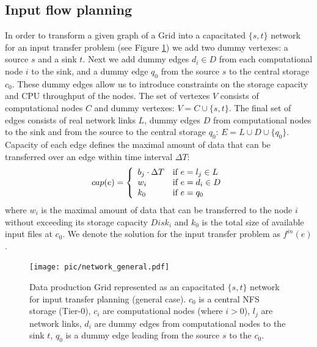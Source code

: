 \documentclass{svjour3}                     %
\begin{document}
\subsection{Input flow planning}

In order to transform a given graph of a Grid into a capacitated $\{s,t\}$
network for an input transfer problem (see Figure \ref{network_general}) we add two dummy vertexes: a source $s$
and a sink $t$. Next we add  dummy edges $d_{i} \in D$ from each computational
node $i$ to the sink, and a dummy edge $q_{0}$ from the source $s$ to the
central storage $c_{0}$. These dummy edges allow us to introduce constraints
on the storage capacity and CPU throughput of the nodes. The set of vertexes $V$ consists of
computational nodes $C$ and dummy vertexes: $V= C \cup \{s,t\}$. The final set
of edges consists of real network links $L$, dummy edges $D$ from
computational nodes to the sink and from the source to the central storage
$q_{0}$: $E= L \cup D \cup \{q_{0}\}$. Capacity of each edge defines the
maximal amount of data that can be transferred over an edge within time
interval $\Delta T$: 
%
\begin{equation} 
\label{edge_cap} 
cap(e) = \left\{
\begin{array}{l l} 
b_{j} \cdot \Delta T & \text{if }e = l_{j} \in L \\ w_{i} &
\text{if } e = d_{i} \in D\\ k_{0} & \text{if } e = q_{0} 
\end{array} \right.
\end{equation} 
%
where $w_{i}$ is the maximal amount of data that can be
transferred to the node $i$ without exceeding its storage capacity $Disk_{i}$
and $k_{0}$ is the total size of available input files at $c_{0}$. We denote
the solution for the input transfer problem as $f^{in}(e)$.
\begin{figure}
	\begin{center}
		\texttt{[image: pic/network\_general.pdf]}
	\end{center}
	\caption{Data production Grid represented as an capacitated $\{s,t\}$ network for input transfer planning (general case). $c_{0}$ is a central NFS storage (Tier-0), $c_{i}$ are computational nodes (where $i>0$), $l_{j}$ are network links, $d_{i}$ are dummy edges from computational nodes to the sink $t$, $q_{0}$ is a dummy edge leading from the source $s$ to the $c_{0}$. }
	\label{network_general}
\end{figure}  
\end{document}
